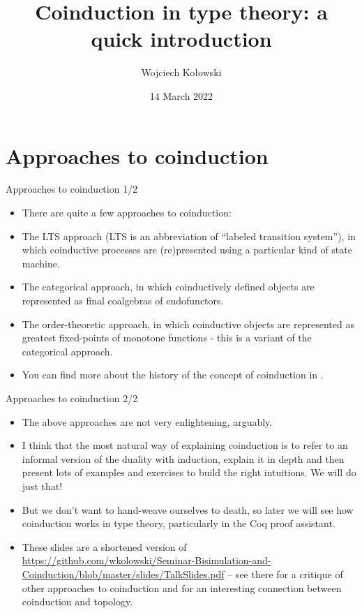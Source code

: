 \documentclass{beamer}
\title{Coinduction in type theory: a quick introduction}
\author{Wojciech Kołowski}
\date{14 March 2022}
\begin{document}
\frame{\titlepage}
\frame{\tableofcontents}

\section{Approaches to coinduction}

\begin{frame}{Approaches to coinduction 1/2}
\begin{itemize}
	\item There are quite a few approaches to coinduction:
	\item The LTS approach (LTS is an abbreviation of ``labeled transition system''), in which coinductive processes are (re)presented using a particular kind of state machine.
	\item The categorical approach, in which coinductively defined objects are represented as final coalgebras of endofunctors.
	\item The order-theoretic approach, in which coinductive objects are represented as greatest fixed-points of monotone functions - this is a variant of the categorical approach.
	\item You can find more about the history of the concept of coinduction in \href{https://dl.acm.org/doi/pdf/10.1145/1516507.1516510}{\color{blue}{On the Origins of Bisimulation and
  Coinduction}}.
\end{itemize}
\end{frame}

\begin{frame}{Approaches to coinduction 2/2}
\begin{itemize}
	\item The above approaches are not very enlightening, arguably.
	\item I think that the most natural way of explaining coinduction is to refer to an informal version of the duality with induction, explain it in depth and then present lots of examples and exercises to build the right intuitions. We will do just that!
  \item But we don't want to hand-weave ourselves to death, so later we will see how coinduction works in type theory, particularly in the Coq proof assistant.
  \item These slides are a shortened version of \url{https://github.com/wkolowski/Seminar-Bisimulation-and-Coinduction/blob/master/slides/TalkSlides.pdf} -- see there for a critique of other approaches to coinduction and for an interesting connection between coinduction and topology.
\end{itemize}
\end{frame}
\end{document}
